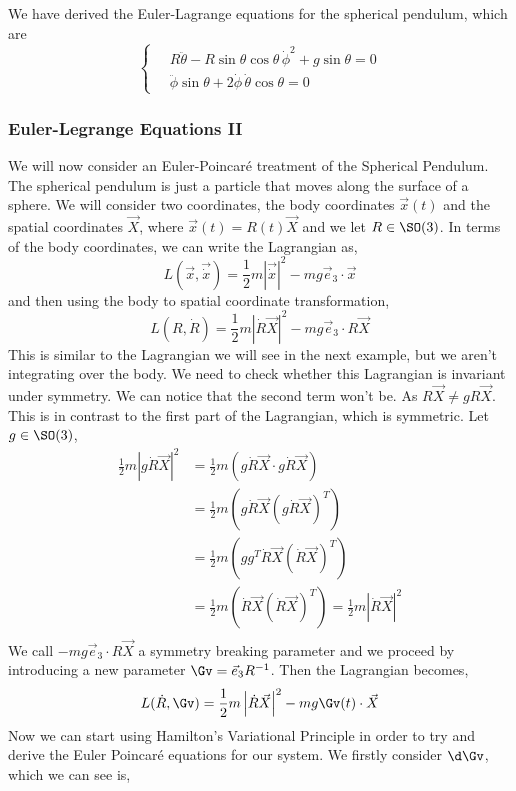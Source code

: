 We have derived the Euler-Lagrange equations for the spherical pendulum, which are
$$ \begin{cases}
  \quad R\ddot{\theta} - R\sin \theta \cos \theta\,\dot \phi^2 + g\sin \theta = 0\\
  \quad\ddot\phi\sin \theta + 2\dot \phi\,\dot\theta\cos \theta = 0
\end{cases} $$

\subsubsection{Euler-Legrange Equations II}
We will now consider an Euler-Poincar\'e treatment of the Spherical Pendulum. The spherical pendulum is just a particle that moves along the surface of a sphere. We will consider two coordinates, the body coordinates $\vec x(t)$ and the spatial coordinates $\vec X$, where $\vec x(t) = R(t)\vec X$ and we let $R \in \SO(3)$. In terms of the body coordinates, we can write the Lagrangian as,
$$ L(\vec x, \vec{\dot x}) = \frac{1}{2}m\left|\vec{\dot x}\right|^2 - mg\vec e_3 \cdot \vec x $$
and then using the body to spatial coordinate transformation,
$$ L\left(R, {\dot R}\right) = \frac{1}{2}m\left|{\dot R\vec X}\right|^2 - mg\vec e_3 \cdot R\vec {X} $$
This is similar to the Lagrangian we will see in the next example, but we aren't integrating over the body. We need to check whether this Lagrangian is invariant under symmetry. We can notice that the second term won't be. As $R\vec{X} \ne gR\vec{X}$. This is in contrast to the first part of the Lagrangian, which is symmetric. Let $g \in \SO(3)$,
\begin{align*}
  \frac{1}{2}m\left|{g\dot R \vec X}\right|^2 &= \frac{1}{2}m\left({g\dot R \vec X} \cdot {g\dot R \vec X}\right)\\
  &= \frac{1}{2}m\left({g\dot R \vec X} \left({g\dot R \vec X}\right)^T\right)\\
  &= \frac{1}{2}m\left({gg^T}{\dot R \vec X} \left({\dot R \vec X}\right)^T\right)\\
  &= \frac{1}{2}m\left({\dot R \vec X} \left({\dot R \vec X}\right)^T\right) = \frac{1}{2}m\left|{\dot R \vec X}\right|^2\\
\end{align*}
We call $-mg\vec e_3 \cdot R\vec{X}$ a symmetry breaking parameter and we proceed by introducing a new parameter $\Gv = \vec e_3R^{-1}$. Then the Lagrangian becomes,
$$ L(\dot R, \Gv) = \frac{1}{2}m\left| \dot R\vec X \right|^2 - mg\Gv(t) \cdot \vec X $$
Now we can start using Hamilton's Variational Principle in order to try and derive the Euler Poincar\'e equations for our system. We firstly consider $\d\Gv$, which we can see is,
